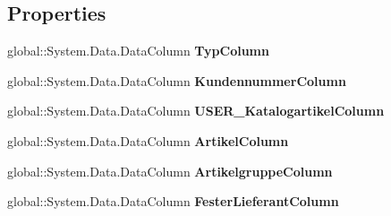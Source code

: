 \subsection*{Properties}
\begin{DoxyCompactItemize}
\item 
global\+::\+System.\+Data.\+Data\+Column {\bfseries Typ\+Column}\hypertarget{class_products_1_1_data_1_1ds_sage_1_1_product_data_table_a09d3d53fae230142c636da23f4f5ba04}{}\label{class_products_1_1_data_1_1ds_sage_1_1_product_data_table_a09d3d53fae230142c636da23f4f5ba04}

\item 
global\+::\+System.\+Data.\+Data\+Column {\bfseries Kundennummer\+Column}\hypertarget{class_products_1_1_data_1_1ds_sage_1_1_product_data_table_add573411a9d7825a45313444afcca4ae}{}\label{class_products_1_1_data_1_1ds_sage_1_1_product_data_table_add573411a9d7825a45313444afcca4ae}

\item 
global\+::\+System.\+Data.\+Data\+Column {\bfseries U\+S\+E\+R\+\_\+\+Katalogartikel\+Column}\hypertarget{class_products_1_1_data_1_1ds_sage_1_1_product_data_table_aff5272d02c2b62e60eb01c1c8d64ea42}{}\label{class_products_1_1_data_1_1ds_sage_1_1_product_data_table_aff5272d02c2b62e60eb01c1c8d64ea42}

\item 
global\+::\+System.\+Data.\+Data\+Column {\bfseries Artikel\+Column}\hypertarget{class_products_1_1_data_1_1ds_sage_1_1_product_data_table_a3ecc0313f07941a48c1e41c25901a8f4}{}\label{class_products_1_1_data_1_1ds_sage_1_1_product_data_table_a3ecc0313f07941a48c1e41c25901a8f4}

\item 
global\+::\+System.\+Data.\+Data\+Column {\bfseries Artikelgruppe\+Column}\hypertarget{class_products_1_1_data_1_1ds_sage_1_1_product_data_table_a44584079584d07e2376d26c99d1262b7}{}\label{class_products_1_1_data_1_1ds_sage_1_1_product_data_table_a44584079584d07e2376d26c99d1262b7}

\item 
global\+::\+System.\+Data.\+Data\+Column {\bfseries Fester\+Lieferant\+Column}\hypertarget{class_products_1_1_data_1_1ds_sage_1_1_product_data_table_a07052501f29f3ae4cceed31c30aa517c}{}\label{class_products_1_1_data_1_1ds_sage_1_1_product_data_table_a07052501f29f3ae4cceed31c30aa517c}


\end{DoxyCompactItemize}
